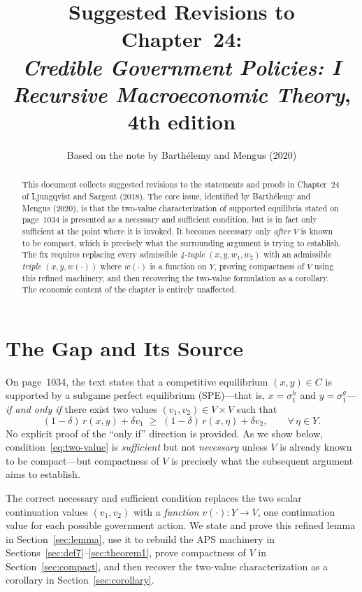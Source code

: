 \documentclass[12pt]{article}
\title{Suggested Revisions to Chapter~24:\\
\textit{Credible Government Policies: I}\\[0.5ex]
\large \textit{Recursive Macroeconomic Theory}, 4th edition}
\author{Based on the note by Barth\'{e}lemy and Mengus (2020)}
\date{}
\theoremstyle{definition}
\begin{document}
\maketitle

\begin{abstract}
\noindent
This document collects suggested revisions to the statements and proofs in
Chapter~24 of Ljungqvist and Sargent (2018). The core issue, identified by
Barth\'{e}lemy and Mengus (2020), is that the two-value characterization of
supported equilibria stated on page~1034 is presented as a necessary and
sufficient condition, but is in fact only sufficient at the point where it is
invoked. It becomes necessary only \emph{after} $V$ is known to be compact,
which is precisely what the surrounding argument is trying to establish. The
fix requires replacing every admissible \emph{4-tuple} $(x, y, w_1, w_2)$ with
an admissible \emph{triple} $(x, y, w(\cdot))$ where $w(\cdot)$ is a function
on $Y$, proving compactness of $V$ using this refined machinery, and then
recovering the two-value formulation as a corollary. The economic content of
the chapter is entirely unaffected.
\end{abstract}

\tableofcontents

\bigskip

\section{The Gap and Its Source}

On page~1034, the text states that a competitive equilibrium $(x, y) \in C$
is supported by a subgame perfect equilibrium (SPE)---that is, $x = \sigma^h_1$
and $y = \sigma^g_1$---\emph{if and only if} there exist two values
$(v_1, v_2) \in V \times V$ such that
\begin{equation}
(1-\delta)\,r(x,y) + \delta v_1
\;\geq\;
(1-\delta)\,r(x,\eta) + \delta v_2,
\qquad \forall\, \eta \in Y.
\label{eq:two-value}
\end{equation}
No explicit proof of the ``only if'' direction is provided. As we show below,
condition~\eqref{eq:two-value} is \emph{sufficient} but not \emph{necessary}
unless $V$ is already known to be compact---but compactness of $V$ is precisely
what the subsequent argument aims to establish.

The correct necessary and sufficient condition replaces the two scalar
continuation values $(v_1, v_2)$ with a \emph{function} $v(\cdot) : Y \to V$,
one continuation value for each possible government action. We state and prove
this refined lemma in Section~\ref{sec:lemma}, use it to rebuild the APS
machinery in Sections~\ref{sec:def7}--\ref{sec:theorem1}, prove compactness of
$V$ in Section~\ref{sec:compact}, and then recover the two-value
characterization as a corollary in Section~\ref{sec:corollary}.
\end{document}
